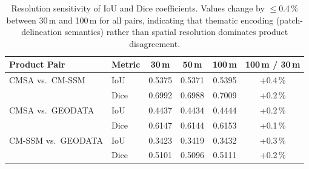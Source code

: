 \begin{table}[htpb]
\centering
\caption{\label{tab:sensitivity_full}Resolution sensitivity of IoU and Dice
  coefficients. Values change by $\leq$0.4\,\% between 30\,m and 100\,m for all
  pairs, indicating that thematic encoding (patch-delineation semantics) rather
  than spatial resolution dominates product disagreement.}
\begin{tabular}{l l c c c c}
\toprule
Product Pair & Metric & 30\,m & 50\,m & 100\,m & 100\,m / 30\,m \\
\midrule
CMSA vs.\ CM-SSM & IoU & 0.5375 & 0.5371 & 0.5395 & +0.4\,\% \\
 & Dice & 0.6992 & 0.6988 & 0.7009 & +0.2\,\% \\
\midrule
CMSA vs.\ GEODATA & IoU & 0.4437 & 0.4434 & 0.4444 & +0.2\,\% \\
 & Dice & 0.6147 & 0.6144 & 0.6153 & +0.1\,\% \\
\midrule
CM-SSM vs.\ GEODATA & IoU & 0.3423 & 0.3419 & 0.3432 & +0.3\,\% \\
 & Dice & 0.5101 & 0.5096 & 0.5111 & +0.2\,\% \\
\midrule
\bottomrule
\end{tabular}
\end{table}
